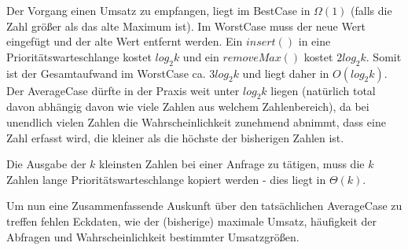 \documentclass{article}
\begin{document}
Der Vorgang einen Umsatz zu empfangen, liegt im BestCase in $\Omega(1)$ (falls
die Zahl größer als das alte Maximum ist). Im WorstCase muss der neue Wert
eingefügt und der alte Wert entfernt werden. Ein $insert()$ in eine
Prioritätswarteschlange kostet $log_2k$ und ein $removeMax()$ kostet $2log_2k$.
Somit ist der Gesamtaufwand im WorstCase ca. $3log_2k$ und liegt daher in
$O(log_2k)$. Der AverageCase dürfte in der Praxis weit unter $log_2k$ liegen
(natürlich total davon abhängig davon wie viele Zahlen aus welchem
Zahlenbereich), da bei unendlich vielen Zahlen die Wahrscheinlichkeit zunehmend
abnimmt, dass eine Zahl erfasst wird, die kleiner als die höchste der
bisherigen Zahlen ist.

Die Ausgabe der $k$ kleinsten Zahlen bei einer Anfrage zu tätigen, muss die $k$
Zahlen lange Prioritätswarteschlange kopiert werden - dies liegt in
$\Theta(k)$.

Um nun eine Zusammenfassende Auskunft über den tatsächlichen AverageCase zu
treffen fehlen Eckdaten, wie der (bisherige) maximale Umsatz, häufigkeit der
Abfragen und Wahrscheinlichkeit bestimmter Umsatzgrößen.
\end{document}

